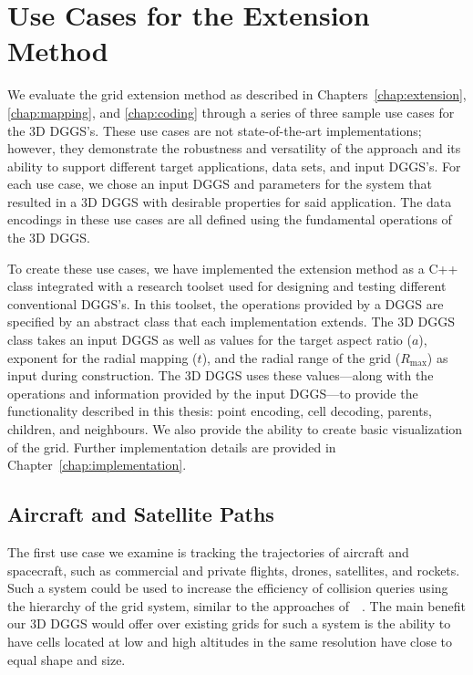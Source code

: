 \chapter{Use Cases for the Extension Method} \label{chap:usecases}
We evaluate the grid extension method as described in Chapters~\ref{chap:extension}, \ref{chap:mapping}, and \ref{chap:coding} through a series of three sample use cases for the 3D DGGS's.
These use cases are not state-of-the-art implementations; however, they demonstrate the robustness and versatility of the approach and its ability to support different target applications, data sets, and input DGGS's.
For each use case, we chose an input DGGS and parameters for the system that resulted in a 3D DGGS with desirable properties for said application.
The data encodings in these use cases are all defined using the fundamental operations of the 3D DGGS.


To create these use cases, we have implemented the extension method as a C++ class integrated with a research toolset used for designing and testing different conventional DGGS's.
In this toolset, the operations provided by a DGGS are specified by an abstract class that each implementation extends.
The 3D DGGS class takes an input DGGS as well as values for the target aspect ratio ($a$), exponent for the radial mapping ($t$), and the radial range of the grid ($R_\mathrm{max}$) as input during construction.
The 3D DGGS uses these values---along with the operations and information provided by the input DGGS---to provide the functionality described in this thesis: point encoding, cell decoding, parents, children, and neighbours.
We also provide the ability to create basic visualization of the grid.
Further implementation details are provided in Chapter~\ref{chap:implementation}.


\section{Aircraft and Satellite Paths}
The first use case we examine is tracking the trajectories of aircraft and spacecraft, such as commercial and private flights, drones, satellites, and rockets.
Such a system could be used to increase the efficiency of collision queries using the hierarchy of the grid system, similar to the approaches of~~\cite{miao2019low, zhai2019collision}.
The main benefit our 3D DGGS would offer over existing grids for such a system is the ability to have cells located at low and high altitudes in the same resolution have close to equal shape and size.


